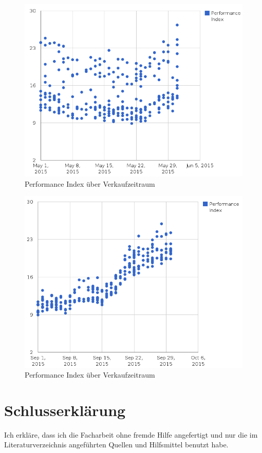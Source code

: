 \documentclass[12pt, a4paper, titlepage]{report}
\begin{document}
		\begin{figure}[htp]
		\centering
		\includegraphics[scale=0.42]{media/performanceOverSellRange.png}
		\caption{Performance Index über Verkaufzeitraum}
		\end{figure}
		
		\begin{figure}[htp]
		\centering
		\includegraphics[scale=0.42]{media/performanceOverBuyRange.png}
		\caption{Performance Index über Verkaufzeitraum}
		\end{figure} 

	\printbibliography[heading=bibintoc,title={Quellenverzeichnis}]
	
    \chapter{Schlusserklärung}
        Ich erkläre, dass ich die Facharbeit ohne fremde Hilfe angefertigt und 
        nur die im Literaturverzeichnis angeführten Quellen und Hilfsmittel benutzt habe.
        
    
\end{document}
